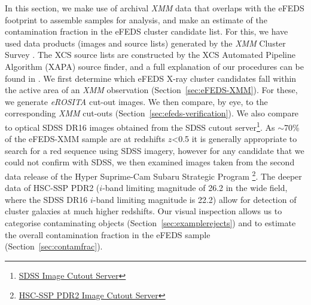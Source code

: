 \documentclass[fleqn,usenatbib]{mnras}
\begin{document}

\label{sec:efedsxmm}



In this section, we make use of archival {\em XMM} data that overlaps with the eFEDS footprint to assemble samples for analysis, and make an estimate of the contamination fraction in the eFEDS cluster candidate list. For this, we have used data products (images and source lists) generated by the {\em XMM} Cluster Survey \citep[XCS,][]{xcsfoundation}. The XCS source lists are constructed by the XCS Automated Pipeline Algorithm (XAPA) source finder, and a full explanation of our procedures can be found in \cite{xcsmethod}. We first determine which eFEDS X-ray cluster candidates fall within the active area of an {\em XMM} observation (Section~\ref{sec:eFEDS-XMM}). For these, we generate {\em eROSITA} cut-out images. We then compare, by eye, to the corresponding {\em XMM} cut-outs (Section~\ref{sec:efeds-verification}). We also compare to optical SDSS DR16 \citep[][]{dr16} images obtained from the SDSS cutout server\footnote{\href{https://skyserver.sdss.org/dr16/SkyserverWS/ImgCutout/getjpeg?ra=134.07450039749338&dec=-1.6358207558060298&width=1631&height=1631}{SDSS Image Cutout Server}}. As ${\sim}$70\% of the eFEDS-XMM sample are at redshifts $z$<0.5 it is generally appropriate to search for a red sequence using SDSS imagery, however for any candidate that we could not confirm with SDSS, we then examined images taken from the second data release of the Hyper Suprime-Cam Subaru Strategic Program \citep[HSC-SSP PDR2,][]{hsc_prd2}\footnote{\href{https://hsc-release.mtk.nao.ac.jp/das_cutout/pdr2/}{\color{blue}HSC-SSP PDR2 Image Cutout Server}}. The deeper data of HSC-SSP PDR2 ($i$-band limiting magnitude of 26.2 in the wide field, where the SDSS DR16 $i$-band limiting magnitude is 22.2) allow for detection of cluster galaxies at much higher redshifts.  Our visual inspection allows us to categorise contaminating objects (Section~\ref{sec:examplerejects}) and to estimate the overall contamination fraction in the eFEDS sample (Section~\ref{sec:contamfrac}).
\end{document}

